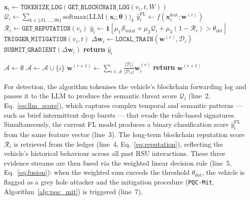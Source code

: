 \documentclass[12pt, a4paper]{report}
\begin{document}
\begin{algorithm}[!ht]
\caption{Full-Version LLM + Federated Learning Detection Pipeline (\texttt{FV-Det})}
\begin{algorithmic}[1]
\small
{}
  \State $\mathbf{x}_i \gets \texttt{TOKENIZE\_LOG}(\texttt{GET\_BLOCKCHAIN\_LOG}(v_i, t, W))$
  \State $\mathcal{Q}_i \gets
    \sum_{k \in \{S1,\ldots,S6\}}
    \mathrm{softmax}\!\bigl(
    \mathrm{LLM}(\mathbf{x}_i;\boldsymbol{\theta})
    \bigr)_{k}$
  \State $\hat{y}_i^{\text{FL}} \gets f(\mathbf{x}_i^{\text{feat}}; \mathbf{w}^{(r)})$
  \State $\mathcal{R}_i \gets \texttt{GET\_REPUTATION}(v_i)$
  \State $\hat{y}_i \gets \mathbf{1}[\mu_1 \mathcal{S}_{\text{total}} + \mu_2 \mathcal{Q}_i + \mu_3(1-\mathcal{R}_i) > \theta_{\text{det}}]$
    \State $\texttt{TRIGGER\_MITIGATION}(v_i, t)$
  \Else
    \State $\Delta\mathbf{w}_i \gets \texttt{LOCAL\_TRAIN}(\mathbf{w}^{(r)}, \mathcal{D}_i)$
    \State $\texttt{SUBMIT\_GRADIENT}(\Delta\mathbf{w}_i)$
  \EndIf
  \State \textbf{return} $\hat{y}_i$
\EndProcedure

\vspace{0.5em}
  \State $\mathcal{A} \gets \emptyset$
      \State $\mathcal{A} \gets \mathcal{A} \cup \{i\}$
    \EndIf
  \EndFor
  \State $\mathbf{w}^{(r+1)} \gets \sum_{i \in \mathcal{A}} \frac{|\mathcal{D}_i|}{|\mathcal{D}_\mathcal{A}|} \mathbf{w}_i^{(r)}$
  \State \textbf{return} $\mathbf{w}^{(r+1)}$
\EndProcedure
\end{algorithmic}
\label{alg:fv_det}
\end{algorithm}

\noindent For detection, the algorithm tokenises the vehicle's blockchain forwarding log
and passes it to the LLM to produce the semantic threat score $\mathcal{Q}_i$
(line~2, Eq.~\eqref{eq:llm_score}), which captures complex temporal and
semantic patterns — such as brief intermittent drop bursts — that evade the
rule-based signatures. Simultaneously, the current FL model produces a binary
classification score $\hat{y}_i^{\text{FL}}$ from the same feature vector
(line~3). The long-term blockchain reputation score $\mathcal{R}_i$ is
retrieved from the ledger (line~4, Eq.~\eqref{eq:reputation}), reflecting the
vehicle's historical behaviour across all past RSU interactions. These three
evidence streams are then fused via the weighted linear decision rule
(line~5, Eq.~\eqref{eq:fusion}): when the weighted sum exceeds the threshold
$\theta_{\text{det}}$, the vehicle is flagged as a grey hole attacker and the
mitigation procedure (\texttt{PQC-Mit}, Algorithm~\ref{alg:pqc_mit}) is
triggered (line~7).
\end{document}
